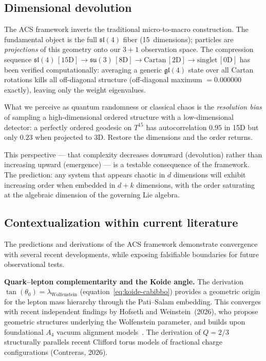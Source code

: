 \documentclass[11pt,a4paper]{article}
\theoremstyle{plain}
\theoremstyle{definition}
\theoremstyle{remark}
\begin{document}
\subsection{Dimensional devolution}

The ACS framework inverts the traditional micro-to-macro construction.
The fundamental object is the full $\mathfrak{sl}(4)$ fiber (15~dimensions);
particles are \emph{projections} of this geometry onto our $3{+}1$
observation space.  The compression sequence
$\mathfrak{sl}(4)\,[15\mathrm{D}] \to \mathfrak{su}(3)\,[8\mathrm{D}]
\to \mathrm{Cartan}\,[2\mathrm{D}] \to \mathrm{singlet}\,[0\mathrm{D}]$
has been verified computationally:  averaging a generic $\mathfrak{gl}(4)$
state over all Cartan rotations kills all off-diagonal structure
(off-diagonal maximum $= 0.000000$ exactly), leaving only the weight
eigenvalues.

What we perceive as quantum randomness or classical chaos is the
\emph{resolution bias} of sampling a high-dimensional ordered structure
with a low-dimensional detector: a perfectly ordered geodesic on $T^{15}$
has autocorrelation $0.95$ in 15D but only $0.23$ when projected to 3D.
Restore the dimensions and the order returns.

This perspective --- that complexity decreases downward (devolution)
rather than increasing upward (emergence) --- is a testable consequence
of the framework.  The prediction: any system that appears chaotic in
$d$ dimensions will exhibit increasing order when embedded in $d + k$
dimensions, with the order saturating at the algebraic dimension of
the governing Lie algebra.

\subsection{Contextualization within current literature}
\label{sec:literature_context}

The predictions and derivations of the ACS framework demonstrate
convergence with several recent developments, while exposing
falsifiable boundaries for future observational tests.

\textbf{Quark--lepton complementarity and the Koide angle.}
The derivation $\tan(\theta_0) = \lambda_{\mathrm{Wolfenstein}}$
(equation~\eqref{eq:koide-cabibbo}) provides a geometric origin for
the lepton mass hierarchy through the Pati--Salam embedding.
This converges with recent independent findings by
Hofseth and Weinstein~(2026), who propose geometric structures
underlying the Wolfenstein parameter, and builds upon foundational
$A_4$ vacuum alignment models~\cite{King2014}.
The derivation of $Q = 2/3$ structurally parallels recent
Clifford torus models of fractional charge configurations
(Contreras, 2026).
\end{document}

